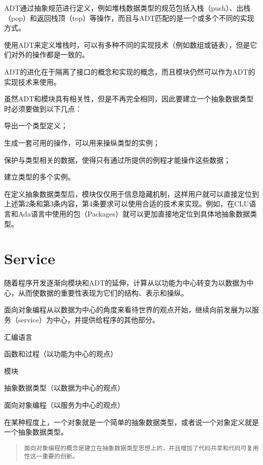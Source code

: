 ADT通过抽象规范进行定义，例如堆栈数据类型的规范包括入栈（push）、出栈（pop）和返回栈顶（top）等操作，而且与ADT匹配的是一个或多个不同的实现方式。

使用ADT来定义堆栈时，可以有多种不同的实现技术（例如数组或链表），但是它们对外的操作都是一致的。

ADT的进化在于隔离了接口的概念和实现的概念，而且模块仍然可以作为ADT的实现技术来使用。

虽然ADT和模块具有相关性，但是不再完全相同，因此要建立一个抽象数据类型时必须要做到以下几点：

\begin{compactenum}
\item 导出一个类型定义；
\item 生成一套可用的操作，可以用来操纵类型的实例；
\item 保护与类型相关的数据，使得只有通过所提供的例程才能操作这些数据；
\item 建立类型的多个实例。
\end{compactenum}

在定义抽象数据类型后，模块仅仅用于信息隐藏机制，这样用户就可以直接定位到上述第2条和第3条内容，第4条要求可以使用合适的技术来实现。例如，在CLU语言和Ada语言中使用的包（Packages）就可以更加直接地定位到具体地抽象数据类型。



\section{Service}



随着程序开发逐渐向模块和ADT的延伸，计算从以功能为中心转变为以数据为中心，从而使数据的重要性表现为它们的结构、表示和操纵。

面向对象编程从以数据为中心的角度来看待世界的观点开始，继续向前发展为以服务（service）为中心，并提供给程序的其他部分。

\begin{compactitem}
\item 汇编语言
\item 函数和过程（以功能为中心的观点）
\item 模块
\item 抽象数据类型（以数据为中心的观点）
\item 面向对象编程（以服务为中心的观点）
\end{compactitem}

在某种程度上，一个对象就是一个简单的抽象数据类型，或者说一个对象定义就是一个抽象数据类型。

\begin{quote}
\texttt{面向对象编程的概念是建立在抽象数据类型思想上的，并且增加了代码共享和代码可复用性这一重要的创新。}
\end{quote}

